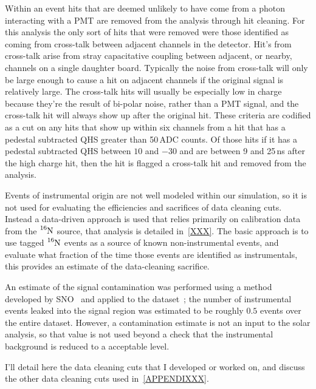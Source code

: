 Within an event hits that are deemed unlikely to have come from a photon interacting with a PMT
are removed from the analysis through hit cleaning.
For this analysis the only sort of hits that were removed were those identified
as coming from cross-talk between adjacent channels in the detector.
Hit's from cross-talk arise from stray capacitative coupling between adjacent, or nearby, channels
on a single daughter board.
Typically the noise from cross-talk will only be large enough to cause a hit
on adjacent channels if the original signal is relatively large.
The cross-talk hits will usually be especially low in charge because they're
the result of bi-polar noise, rather than a PMT signal, and the cross-talk
hit will always show up after the original hit.
These criteria are codified as a cut on any hits that show up within
 six channels from a hit that has a pedestal subtracted QHS greater
than 50\,ADC counts. Of those hits if it has a pedestal subtracted QHS between
$10$ and $-30$ and are between 9 and 25\,ns after the high charge hit,
then the hit is flagged a cross-talk hit and removed from the analysis.

Events of instrumental origin are not well modeled within our simulation,
so it is not used for evaluating the efficiencies and sacrifices of
data cleaning cuts.
Instead a data-driven approach is used that relies primarily on calibration
data from the $\ce{^{16}N}$ source, that analysis is detailed in~\ref{XXX}.%
The basic approach is to use tagged $\ce{^{16}N}$ events as a source of known
non-instrumental events, and evaluate what fraction of the time those events
are identified as instrumentals, this provides an estimate of the data-cleaning
sacrifice.

An estimate of the signal contamination was performed using a method developed
by SNO~\cite{NEIL_THESIS} and applied to the dataset~\cite{DC_DOCUMENT};
the number of instrumental events leaked into the signal region was estimated
to be roughly $0.5$ events over the entire dataset.
However, a contamination estimate is not an input to the solar analysis,
so that value is not used beyond a check that the instrumental background
is reduced to a acceptable level.

I'll detail here the data cleaning cuts
that I developed or worked on, and discuss the other data cleaning cuts used
in~\ref{APPENDIXXX}.

